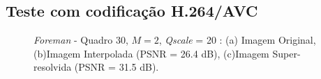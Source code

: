 \subsection{Teste com codificação H.264/AVC}
\begin{figure}[h]
    \centering
    \qquad
	

    \caption{\textit{Foreman} - Quadro 30, $M = 2$, \textit{Qscale} = 20 : (a) Imagem Original, (b)Imagem Interpolada (PSNR = 26.4 dB), (c)Imagem Super-resolvida (PSNR = 31.5 dB).}
	    
    \label{fig:4}
\end{figure}

